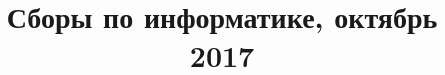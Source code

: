 \documentclass[utf8,xcolor=table,14pt]{beamer}
\begin{document}
\title{Сборы по информатике, октябрь 2017}

\end{document}
